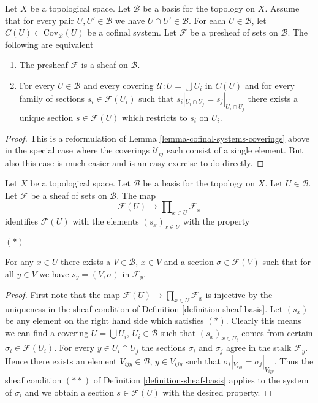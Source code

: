 \begin{lemma}
\label{lemma-cofinal-systems-coverings-standard-case}
Let $X$ be a topological space.
Let $\mathcal{B}$ be a basis for the topology on $X$.
Assume that for every pair $U, U' \in \mathcal{B}$
we have $U \cap U' \in \mathcal{B}$.
For each $U \in \mathcal{B}$, let $C(U) \subset \text{Cov}_{\mathcal{B}}(U)$
be a cofinal system.
Let $\mathcal{F}$ be a presheaf of sets on $\mathcal{B}$.
The following are equivalent
\begin{enumerate}
\item The presheaf $\mathcal{F}$ is a sheaf on $\mathcal{B}$.
\item For every $U \in \mathcal{B}$ and every covering
$\mathcal{U} : U = \bigcup U_i$ in $C(U)$ and for every
family of sections $s_i \in \mathcal{F}(U_i)$ such
that $s_i|_{U_i \cap U_j} = s_j|_{U_i \cap U_j}$ there
exists a unique section $s \in \mathcal{F}(U)$ which
restricts to $s_i$ on $U_i$.
\end{enumerate}
\end{lemma}

\begin{proof}
This is a reformulation of
Lemma \ref{lemma-cofinal-systems-coverings} above
in the special case where the coverings $\mathcal{U}_{ij}$
each consist of a single element. But also this case is much
easier and is an easy exercise to do directly.
\end{proof}

\begin{lemma}
\label{lemma-condition-star-sections}
Let $X$ be a topological space.
Let $\mathcal{B}$ be a basis for the topology on $X$.
Let $U \in \mathcal{B}$.
Let $\mathcal{F}$ be a sheaf of sets on $\mathcal{B}$.
The map
$$
\mathcal{F}(U) \to \prod\nolimits_{x \in U} \mathcal{F}_x
$$
identifies $\mathcal{F}(U)$ with the elements $(s_x)_{x\in U}$
with the property
\begin{list}{$(*)$}{}
\item For any $x \in U$ there exists a $V \in \mathcal{B}$,
$x \in V$ and a section $\sigma \in \mathcal{F}(V)$ such that
for all $y \in V$ we have $s_y = (V, \sigma)$ in $\mathcal{F}_y$.
\end{list}
\end{lemma}

\begin{proof}
First note that the map
$\mathcal{F}(U) \to \prod\nolimits_{x \in U} \mathcal{F}_x$
is injective by the uniqueness in the sheaf condition
of Definition \ref{definition-sheaf-basis}. Let $(s_x)$ be
any element on the right hand side which satisfies $(*)$.
Clearly this means we can find a covering $U = \bigcup U_i$,
$U_i \in \mathcal{B}$ such that $(s_x)_{x \in U_i}$ comes from
certain $\sigma_i \in \mathcal{F}(U_i)$. For every $y \in U_i \cap U_j$
the sections $\sigma_i$ and $\sigma_j$ agree in the stalk
$\mathcal{F}_y$. Hence there exists an element $V_{ijy} \in \mathcal{B}$,
$y \in V_{ijy}$ such that $\sigma_i|_{V_{ijy}} = \sigma_j|_{V_{ijy}}$.
Thus the sheaf condition $(**)$ of Definition \ref{definition-sheaf-basis}
applies to the system of $\sigma_i$ and we obtain a section
$s \in \mathcal{F}(U)$ with the desired property.
\end{proof}

